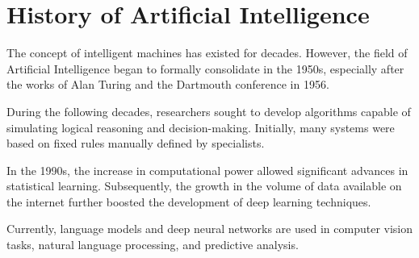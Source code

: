 \section{History of Artificial Intelligence}

The concept of intelligent machines has existed for decades. However, the field of Artificial
Intelligence began to formally consolidate in the 1950s, especially after the works of Alan
Turing and the Dartmouth conference in 1956.

During the following decades, researchers sought to develop algorithms capable of
simulating logical reasoning and decision-making. Initially, many systems were based on
fixed rules manually defined by specialists.

In the 1990s, the increase in computational power allowed significant advances in
statistical learning. Subsequently, the growth in the volume of data available on the
internet further boosted the development of deep learning techniques.

Currently, language models and deep neural networks are used in computer vision tasks,
natural language processing, and predictive analysis.
 